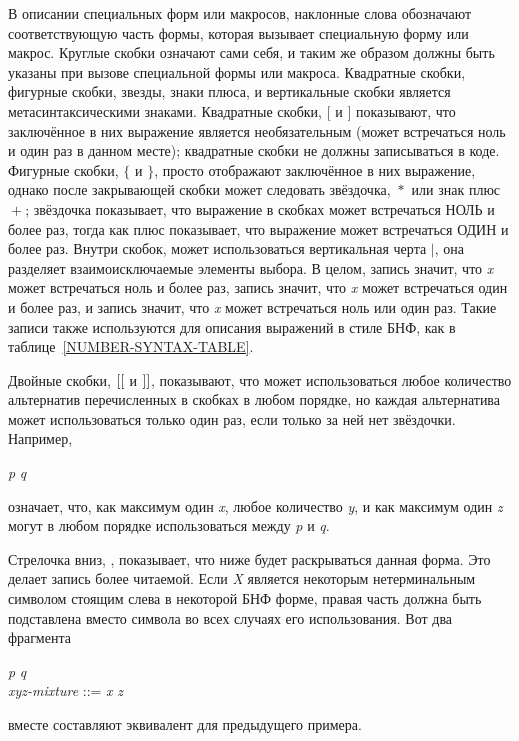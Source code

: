 В описании специальных форм или макросов, наклонные слова обозначают
соответствующую часть формы, которая вызывает специальную форму или макрос.
Круглые скобки означают сами себя, и таким же образом должны быть указаны при
вызове специальной формы или макроса.
Квадратные скобки, фигурные скобки, звезды, знаки плюса, и вертикальные скобки
является метасинтаксическими знаками.
Квадратные скобки,
$\lbrack$ и $\rbrack$ показывают, что заключённое в них выражение является
необязательным (может встречаться ноль и один раз в данном месте); квадратные
скобки не должны записываться в коде.
Фигурные скобки, $\lbrace$ и $\rbrace$, просто отображают заключённое в них
выражение, однако после закрывающей скобки может следовать звёздочка, ${}*$ или
знак плюс ${}+$; звёздочка показывает, что выражение в скобках может
встречаться НОЛЬ и более раз, тогда как плюс показывает, что выражение может
встречаться ОДИН и более раз. Внутри скобок, может использоваться вертикальная
черта $|$, она разделяет взаимоисключаемые элементы выбора.
В целом, запись  значит, что \emph{x} может встречаться ноль и
более раз, запись  значит, что \emph{x} может встречаться один и
более раз, и запись  значит, что \emph{x} может встречаться ноль или
один раз. Такие записи также используются для описания выражений в стиле БНФ,
как в таблице~\ref{NUMBER-SYNTAX-TABLE}.

\begin{newer}
Двойные скобки, $\lbrack\lbrack$ и $\rbrack\rbrack$, показывают, что может использоваться
любое количество альтернатив перечисленных в скобках в любом порядке, но каждая
альтернатива может использоваться только один раз, если только за ней нет
звёздочки.
Например,
\begin{tabbing}
\emph{p}  \emph{q}
\end{tabbing}
означает, что, как максимум один \emph{x}, любое количество \emph{y}, и как максимум
один \emph{z} могут в любом порядке использоваться между \emph{p} и \emph{q}.

Стрелочка вниз, \Mind{}, показывает, что ниже будет раскрываться данная
форма. Это делает запись \Mchoice{~} более читаемой. Если \emph{X} является
некоторым нетерминальным символом стоящим слева в некоторой БНФ форме, правая
часть должна быть подставлена вместо символа  во всех случаях его
использования. Вот два фрагмента

\begin{tabbing}
\emph{p}  \emph{q} \\
\emph{xyz-mixture} ::= \emph{x\/} {\Mor}  {\Mor} \emph{z\/}
\end{tabbing}
вместе составляют эквивалент для предыдущего примера.
\end{newer}

